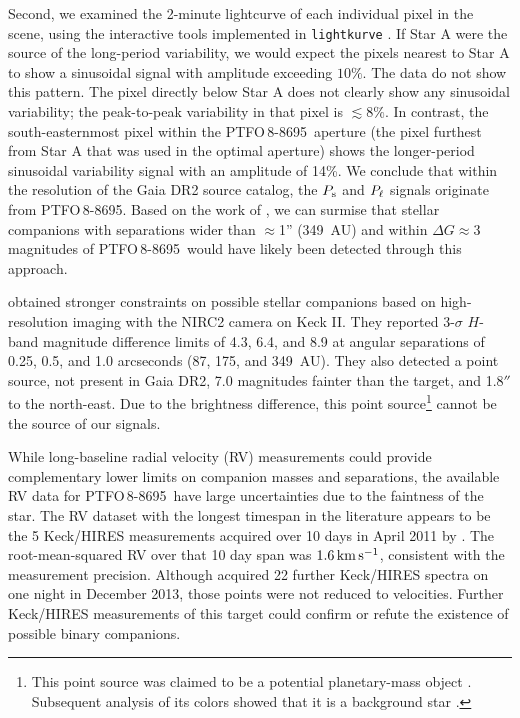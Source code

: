 \documentclass[12pt,twocolumn,tighten]{aastex62}
\newcommand{\ptfo}{PTFO$\,$8-8695}
\begin{document}
Second, we examined the 2-minute lightcurve of each individual pixel in the scene,
using the interactive tools implemented in
\texttt{lightkurve} \citep{lightkurve_2018}.  If Star A were the
source of the long-period variability, we would expect the pixels
nearest to Star A to show a sinusoidal signal with amplitude exceeding
$10\%$.  The data do not show this pattern.  The pixel directly
below Star A does not clearly show any sinusoidal variability; the
peak-to-peak variability in that pixel is $\lesssim 8\%$.  In
contrast, the south-easternmost pixel within the \ptfo\ aperture (the
pixel furthest from Star A that was used in the optimal aperture)
shows the longer-period sinusoidal variability signal with an amplitude of
14\%.  We conclude that within the resolution of the Gaia
DR2 source catalog, the $P_{\rm s}$ and $P_{\rm \ell}$ signals
originate from \ptfo.  Based on the work of \citet{ziegler_measuring_2018}, we can
surmise that stellar companions with separations wider than $\approx$1'' (349~AU) and
within $\Delta G \approx 3$ magnitudes of \ptfo\ would have likely
been detected through this approach. 

\citet{van_eyken_ptf_2012} obtained stronger constraints on possible
stellar companions based on high-resolution imaging with the NIRC2 camera on Keck II.  They reported
3-$\sigma$ $H$-band magnitude difference limits of 4.3, 6.4, and 8.9 at
angular separations of 0.25, 0.5, and 1.0 arcseconds (87, 175, and
349~AU).  They also detected a point source, not present in Gaia DR2,
7.0 magnitudes fainter than the target, and 1.8$''$ to the north-east.  Due
to the brightness difference, this point source\footnote{This
point source was claimed to be a potential planetary-mass object
\citep{schmidt_direct_2016}. Subsequent analysis of its colors showed
that it is a background star \citep{lee_evidence_2018}.} cannot be the
source of our signals.

While long-baseline radial velocity (RV) measurements could provide
complementary lower limits on companion masses and separations, the available RV
data for \ptfo\ have large uncertainties due to the faintness of the star.  The
RV dataset with the longest timespan in the literature appears to be the 5
Keck/HIRES measurements acquired over 10 days in April 2011 by
\citet{van_eyken_ptf_2012}.  The root-mean-squared RV over that 10 day span was
$1.6\,{\rm km}\,{\rm s}^{-1}$, consistent with the measurement
precision.  Although \citet{yu_tests_2015} acquired 22 further
Keck/HIRES spectra on one night in December 2013, those points
were not reduced to velocities. Further Keck/HIRES
measurements of this target could confirm or refute the existence of
possible binary companions.
\end{document}
